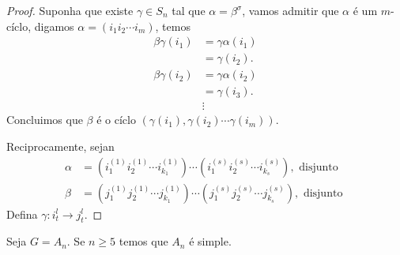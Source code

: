 \begin{proof} 
  Suponha que existe $\gamma\in S_n$ tal que $\alpha=\beta^{\sigma}$, vamos admitir que $\alpha$ é um $m$-cíclo, digamos $\alpha=(i_1i_2\cdots i_m)$, temos
  \begin{align*}
    \beta\gamma(i_1)&=\gamma\alpha(i_1)\\
    &=\gamma(i_2).\\
    \beta\gamma(i_2)&=\gamma\alpha(i_2)\\
    &=\gamma(i_3).\\
    &\vdots
  \end{align*}
  Concluimos que $\beta$ é o cíclo $(\gamma(i_1),\gamma(i_2)\cdots\gamma(i_m))$.

  Reciprocamente, sejan
  \begin{align*}
    \alpha&=(i_1^{(1)}i_2^{(1)}\cdots i_{k_1}^{(1)})\cdots(i_1^{(s)}i_{2}^{(s)}\cdots i_{k_s}^{(s)}),\text{ disjunto }\\
    \beta&=(j_1^{(1)}j_2^{(1)}\cdots j_{k_1}^{(1)})\cdots(j_1^{(s)}j_{2}^{(s)}\cdots j_{k_s}^{(s)}),\text{ disjunto }
  \end{align*}
  Defina $\gamma: i_t^{l}\to j_t^{l}$.
\end{proof}
\begin{theorem}[$A_n$ é simple]
  Seja $G=A_n$. Se $n\geq 5$ temos que $A_n$ é simple. 
\end{theorem}
